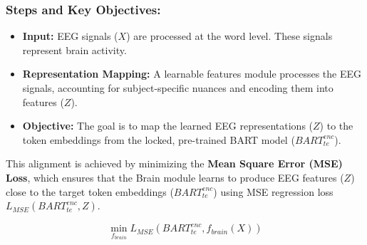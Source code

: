 \documentclass[journal]{IEEEtran}
\begin{document}
\subsubsection{Steps and Key Objectives:}
\begin{itemize}
	\item \textbf{Input:} EEG signals (\(X\)) are processed at the word level. These signals represent brain activity.
	\item \textbf{Representation Mapping:} A learnable features module processes the EEG signals, accounting for subject-specific nuances and encoding them into features (\(Z\)).
	\item \textbf{Objective:} The goal is to map the learned EEG representations (\(Z\)) to the token embeddings from the locked, pre-trained BART model (\(BART_{te}^{enc}\)).
\end{itemize}

\noindent This alignment is achieved by minimizing the \textbf{Mean Square Error (MSE) Loss}, which ensures that the Brain module learns to produce EEG features (\(Z\)) close to the target token embeddings (\(BART_{te}^{enc}\)) using MSE regression loss \(L_{MSE}(BART_{te}^{enc}, Z)\).

\begin{equation}
	\min_{f_{brain}} L_{MSE}(BART_{te}^{enc}, f_{brain}(X))
\end{equation}
\end{document}
